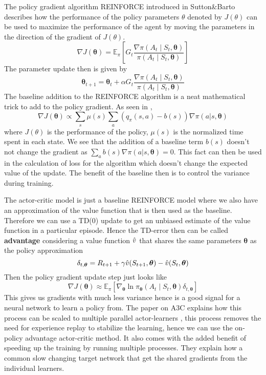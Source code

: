 The policy gradient algorithm REINFORCE introduced in Sutton\&Barto \cite{Sutton1998} describes how the performance of the policy parameters $\theta$ denoted by $J(\theta)$ can be used to maximize the performance of the agent by moving the parameters in the direction of the gradient of $J(\theta)$.
\[
   \nabla J(\boldsymbol{\theta})= \mathbb{E}_{\pi}\left[ G_{t} \frac{\nabla \pi(A_{t}\mid S_{t},\boldsymbol{\theta})}{\pi(A_{t}\mid S_{t},\boldsymbol{\theta})} \right]  
\]
The parameter update then is given by 
\[ 
    \boldsymbol{\theta}_{t+1} = \boldsymbol{\theta}_{t} + \alpha G_{t}\frac{\nabla \pi(A_{t}\mid S_{t},\boldsymbol{\theta})}{\pi(A_{t}\mid S_{t},\boldsymbol{\theta})}
\]
The baseline addition to the REINFORCE algorithm is a neat mathematical trick to add to the policy gradient. As seen in \cite{Sutton1998},
\[
    \nabla J(\boldsymbol{\theta}) \propto \sum_{s} \mu(s) \sum_{a}\left(q_{\pi}(s, a)-b(s)\right) \nabla \pi(a | s, \boldsymbol{\theta})
\]
where $J(\theta)$ is the performance of the policy, $\mu(s)$ is the normalized time spent in each state. We see that the addition of a baseline term $b(s)$ doesn't not change the gradient as $    \sum_{a} b(s) \nabla \pi(a | s, \boldsymbol{\theta}) = 0$. This fact can then be used in the calculation of loss for the algorithm which doesn't change the expected value of the update. The benefit of the baseline then is to control the variance during training. 

\medskip
\noindent
The actor-critic model is just a baseline REINFORCE model where we also have an approximation of the value function that is then used as the baseline. Therefore we can use a TD(0) update to get an unbiased estimate of the value function in a particular episode. Hence the TD-error then can be called \textbf{advantage} considering a value function $\Hat{v}$ that shares the same parameters $\boldsymbol{\theta}$ as the policy approximation
\[ 
    \delta_{t,\boldsymbol{\theta}} = R_{t+1} +\gamma\Hat{v}(S_{t+1},\boldsymbol{\theta}) - \Hat{v}(S_{t},\boldsymbol{\theta})
\]
Then the policy gradient update step just looks like 
\[ 
    \nabla J(\boldsymbol{\theta}) \approx \mathbb{E}_{\pi}\left[ \nabla_{\boldsymbol{\theta}} \ln \pi_{\boldsymbol{\theta}}(A_{t}\mid S_{t},\boldsymbol{\theta})\delta_{t,\boldsymbol{\theta}} \right]   
\]
This gives us gradients with much less variance hence is a good signal for a neural network to learn a policy from. The paper on A3C \cite{A3C} explains how this process can be scaled to multiple parallel actor-learners , this process removes the need for experience replay to stabilize the learning, hence we can use the on-policy advantage actor-critic method. It also comes with the added benefit of speeding up the training by running multiple processes. They explain how a common slow changing target network that get the shared gradients from the individual learners. 

